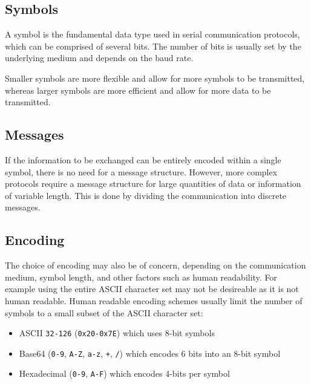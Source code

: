 \documentclass{report}
\begin{document}
\subsection{Symbols}
A symbol is the fundamental data type used in serial communication protocols,
which can be comprised of several bits. The number of bits is usually set by the
underlying medium and depends on the baud rate.

Smaller symbols are more flexible and allow for more symbols to be transmitted,
whereas larger symbols are more efficient and allow for more data to be transmitted.
\subsection{Messages}
If the information to be exchanged can be entirely encoded within a single symbol, there
is no need for a message structure. However, more complex protocols require a message structure
for large quantities of data or information of variable length. This is done by dividing the
communication into discrete messages.
\subsection{Encoding}
The choice of encoding may also be of concern, depending on the communication medium, symbol length,
and other factors such as human readability. For example using the entire ASCII character set
may not be desireable as it is not human readable. Human readable encoding schemes usually limit
the number of symbols to a small subset of the ASCII character set:
\begin{itemize}
    \item ASCII \texttt{32-126} (\texttt{0x20-0x7E}) which uses 8-bit symbols %
    \item Base64 (\texttt{0-9}, \texttt{A-Z}, \texttt{a-z}, \texttt{+}, \texttt{/}) which encodes 6 bits into an 8-bit symbol %
    \item Hexadecimal (\texttt{0-9}, \texttt{A-F}) which encodes 4-bits per symbol %
\end{itemize}
\end{document}
